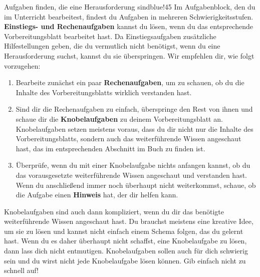 \documentclass[../main.tex]{subfiles}
\begin{document}
\begin{goal}{Aufgaben finden, die eine Herausforderung sind}{blue!45}
    Im Aufgabenblock, den du im Unterricht bearbeitest, findest du Aufgaben in mehreren Schwierigkeitsstufen. \textbf{Einstiegs- und Rechenaufgaben} kannst du lösen, wenn du das entsprechende Vorbereitungsblatt bearbeitet hast. Da Einstiegsaufgaben zusätzliche Hilfestellungen geben, die du vermutlich nicht benötigst, wenn du eine Herausforderung suchst, kannst du sie überspringen. Wir empfehlen dir, wie folgt vorzugehen:
    \begin{enumerate}
        \item[\tikzball{blue!50!black}{1}] Bearbeite zunächst ein paar \textbf{Rechenaufgaben}, um zu schauen, ob du die Inhalte des Vorbereitungsblatts wirklich verstanden hast.
        \item[\tikzball{blue!50!black}{2}] Sind dir die Rechenaufgaben zu einfach, überspringe den Rest von ihnen und schaue dir die \textbf{Knobelaufgaben} zu deinem Vorbereitungsblatt an. Knobelaufgaben setzen meistens voraus, dass du dir nicht nur die Inhalte des Vorbereitungsblatts, sondern auch das weiterführende Wissen angeschaut hast, das im entsprechenden Abschnitt im Buch zu finden ist. 
        \item[\tikzball{blue!50!black}{3}] Überprüfe, wenn du mit einer Knobelaufgabe nichts anfangen kannst, ob du das vorausgesetzte weiterführende Wissen angeschaut und verstanden hast. Wenn du anschließend immer noch überhaupt nicht weiterkommst, schaue, ob die Aufgabe einen \textbf{Hinweis} hat, der dir helfen kann.
    \end{enumerate}
    Knobelaufgaben sind auch dann kompliziert, wenn du dir das benötigte weiterführende Wissen angeschaut hast. Du brauchst meistens eine kreative Idee, um sie zu lösen und kannst nicht einfach einem Schema folgen, das du gelernt hast. Wenn du es daher überhaupt nicht schaffst, eine Knobelaufgabe zu lösen, dann lass dich nicht entmutigen. Knobelaufgaben sollen auch für dich schwierig sein und du wirst nicht jede Knobelaufgabe lösen können. Gib einfach nicht zu schnell auf!
\end{goal}
\end{document}
